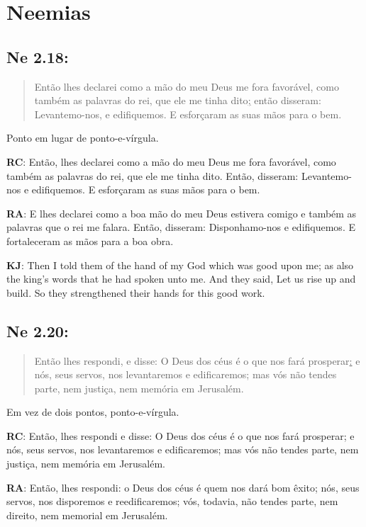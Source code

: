 \section{Neemias}
\subsection*{Ne 2.18:} 
\begin{quote}
    \small
Então lhes declarei como a mão do meu Deus me fora favorável, como também as palavras do rei, que ele me tinha dito\uline{;} então disseram: Levantemo-nos, e edifiquemos. E esforçaram as suas mãos para o bem.
\end{quote}

Ponto em lugar de ponto-e-vírgula.

\textbf{RC}: Então, lhes declarei como a mão do meu Deus me fora favorável, como também as palavras do rei, que ele me tinha dito. Então, disseram: Levantemo-nos e edifiquemos. E esforçaram as suas mãos para o bem.

\textbf{RA}: E lhes declarei como a boa mão do meu Deus estivera comigo e também as palavras que o rei me falara. Então, disseram: Disponhamo-nos e edifiquemos. E fortaleceram as mãos para a boa obra.

\textbf{KJ}: Then I told them of the hand of my God which was good upon me; as also the king’s words that he had spoken unto me. And they said, Let us rise up and build. So they strengthened their hands for this good work.

\subsection*{Ne 2.20:} 
\begin{quote}
    \small
Então lhes respondi, e disse: O Deus dos céus é o que nos fará prosperar\uline{:} e nós, seus servos, nos levantaremos e edificaremos; mas vós não tendes parte, nem justiça, nem memória em Jerusalém.
\end{quote}

Em vez de dois pontos, ponto-e-vírgula.

\textbf{RC}: Então, lhes respondi e disse: O Deus dos céus é o que nos fará prosperar; e nós, seus servos, nos levantaremos e edificaremos; mas vós não tendes parte, nem justiça, nem memória em Jerusalém.

\textbf{RA}: Então, lhes respondi: o Deus dos céus é quem nos dará bom êxito; nós, seus servos, nos disporemos e reedificaremos; vós, todavia, não tendes parte, nem direito, nem memorial em Jerusalém.

